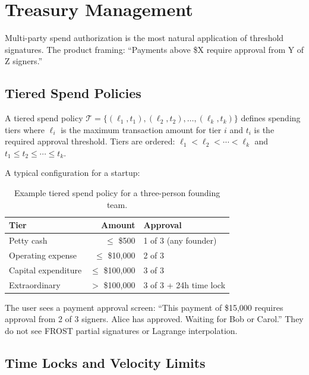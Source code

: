 \section{Treasury Management}
\label{sec:treasury}

Multi-party spend authorization is the most natural application of
threshold signatures. The product framing: ``Payments above \$X require
approval from Y of Z signers.''

\subsection{Tiered Spend Policies}

\begin{definition}
A tiered spend policy $\mathcal{T} = \{(\ell_1, t_1), (\ell_2, t_2), \ldots, (\ell_k, t_k)\}$
defines spending tiers where $\ell_i$ is the maximum transaction amount for
tier $i$ and $t_i$ is the required approval threshold. Tiers are ordered:
$\ell_1 < \ell_2 < \cdots < \ell_k$ and $t_1 \leq t_2 \leq \cdots \leq t_k$.
\end{definition}

A typical configuration for a startup:

\begin{table}[H]
\centering
\caption{Example tiered spend policy for a three-person founding team.}
\label{tab:tiers}
\begin{tabular}{lrl}
\toprule
\textbf{Tier} & \textbf{Amount} & \textbf{Approval} \\
\midrule
Petty cash & $\leq$ \$500 & 1 of 3 (any founder) \\
Operating expense & $\leq$ \$10,000 & 2 of 3 \\
Capital expenditure & $\leq$ \$100,000 & 3 of 3 \\
Extraordinary & $>$ \$100,000 & 3 of 3 + 24h time lock \\
\bottomrule
\end{tabular}
\end{table}

The user sees a payment approval screen: ``This payment of \$15,000 requires
approval from 2 of 3 signers. Alice has approved. Waiting for Bob or Carol.''
They do not see FROST partial signatures or Lagrange interpolation.

\subsection{Time Locks and Velocity Limits}

